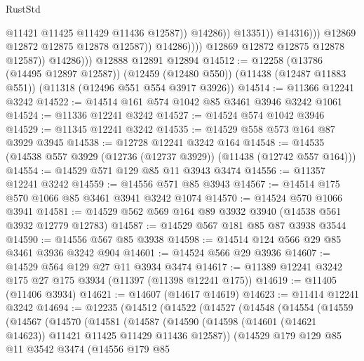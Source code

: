 \begin{lexlean}{RustStd}
\begin{coremodule}
                                            @11421
                                            @11425
                                            @11429
                                            @11436
                                            @12587))
                                        @14286))
                                    @13351))
                                @14316)))
                          @12869
                          @12872
                          @12875
                          @12878
                          @12587))
                      @14286))))
              @12869
              @12872
              @12875
              @12878
              @12587))
          @14286)))
    @12888
    @12891
    @12894
@14512 := @12258
    (@13786 (@14495 @12897 @12587))
    (@12459 (@12480 @550))
    (@11438 (@12487 @11883 @551))
    (@11318 (@12496 @551 @554 @3917 @3926))
@14514 := @11366 @12241 @3242
@14522 := @14514 @161 @574 @1042 @85 @3461 @3946 @3242 @1061
@14524 := @11336 @12241 @3242
@14527 := @14524 @574 @1042 @3946
@14529 := @11345 @12241 @3242
@14535 := @14529 @558 @573 @164 @87 @3929 @3945
@14538 := @12728 @12241 @3242 @164
@14548 := @14535 (@14538 @557 @3929 (@12736 (@12737 @3929)) (@11438 (@12742 @557 @164)))
@14554 := @14529 @571 @129 @85 @11 @3943 @3474
@14556 := @11357 @12241 @3242
@14559 := @14556 @571 @85 @3943
@14567 := @14514 @175 @570 @1066 @85 @3461 @3941 @3242 @1074
@14570 := @14524 @570 @1066 @3941
@14581 := @14529 @562 @569 @164 @89 @3932 @3940 (@14538 @561 @3932 @12779 @12783)
@14587 := @14529 @567 @181 @85 @87 @3938 @3544
@14590 := @14556 @567 @85 @3938
@14598 := @14514 @124 @566 @29 @85 @3461 @3936 @3242 @904
@14601 := @14524 @566 @29 @3936
@14607 := @14529 @564 @129 @27 @11 @3934 @3474
@14617 := @11389 @12241 @3242 @175 @27 @175 @3934 (@11397 (@11398 @12241 @175))
@14619 := @11405 (@11406 @3934)
@14621 := @14607 (@14617 @14619)
@14623 := @11414 @12241 @3242
@14694 := @12235
    (@14512
      (@14522
        (@14527
          (@14548
            (@14554
              (@14559
                (@14567
                  (@14570
                    (@14581
                      (@14587
                        (@14590
                          (@14598 (@14601 (@14621 @14623)) @11421 @11425 @11429 @11436 @12587))
                        (@14529
                          @179
                          @129
                          @85
                          @11
                          @3542
                          @3474
                          (@14556
                            @179
                            @85

\end{coremodule}
\end{lexlean}
